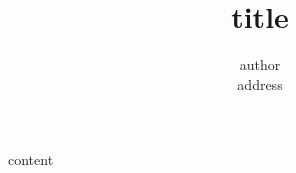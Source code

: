\documentclass[10pt,oneside,a4paper]{article}
\author{ {{author}} \\ {{address}} }
\title{ {{title}} }
\begin{document}
\maketitle

{{content}}
\end{document}
